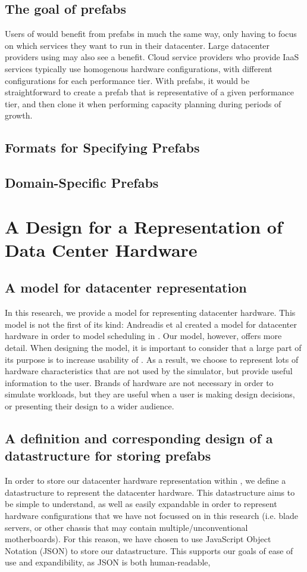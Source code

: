 \documentclass[11pt]{article}
\begin{document}
	\subsection{The goal of prefabs}
		Users of \opendc{} would benefit from prefabs in much the same way, only having to focus on which services they want to run in their datacenter.
		Large datacenter providers using \opendc{} may also see a benefit. 
		Cloud service providers who provide IaaS services typically use homogenous hardware configurations, with different configurations for each performance tier. 
		With prefabs, it would be straightforward to create a prefab that is representative of a given performance tier, and then clone it when performing capacity planning during periods of growth.
	\subsection{Formats for Specifying Prefabs}

	\subsection{Domain-Specific Prefabs}


\section{A Design for a Representation of Data Center Hardware}

	\subsection{A model for datacenter representation}
		In this research, we provide a model for representing datacenter hardware. 
		This model is not the first of its kind: Andreadis et al created a model for datacenter hardware in order to model scheduling in \opendc{} \cite{Andreadis2018}. 
		Our model, however, offers more detail. 
		When designing the model, it is important to consider that a large part of its purpose is to increase usability of \opendc{}. 
		As a result, we choose to represent lots of hardware characteristics that are not used by the simulator, but provide useful information to the user. 
		Brands of hardware are not necessary in order to simulate workloads, but they are useful when a user is making design decisions, or presenting their design to a wider audience.
	\subsection{A definition and corresponding design of a datastructure for storing prefabs}
		In order to store our datacenter hardware representation within \opendc{}, we define a datastructure to represent the datacenter hardware. 
		This datastructure aims to be simple to understand, as well as easily expandable in order to represent hardware configurations that we have not focussed on in this research (i.e. blade servers, or other chassis that may contain multiple/unconventional motherboards). 
		For this reason, we have chosen to use JavaScript Object Notation (JSON) to store our datastructure. 
		This supports our goals of ease of use and expandibility, as JSON is both human-readable, 
\end{document}
